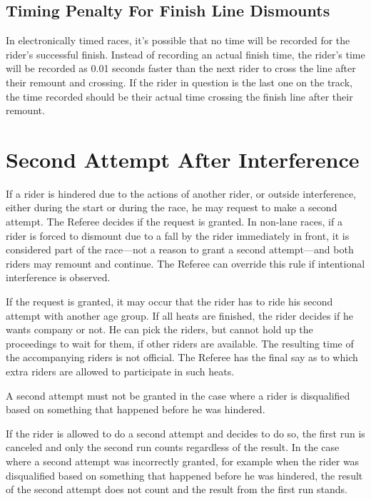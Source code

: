 \subsection{Timing Penalty For Finish Line Dismounts}
In electronically timed races, it's possible that no time will be recorded for the rider's successful finish.
Instead of recording an actual finish time, the rider's time will be recorded as 0.01 seconds faster than the next rider to cross the line after their remount and crossing.
If the rider in question is the last one on the track, the time recorded should be their actual time crossing the finish line after their remount.

\section{Second Attempt After Interference}
If a rider is hindered due to the actions of another rider, or outside interference, either during the start or during the race, he may request to make a second attempt.
The Referee decides if the request is granted. In non-lane races, if a rider is forced to dismount due to a fall by the rider immediately in front, it is considered part of the race---not a reason to grant a second attempt---and both riders may remount and continue.
The Referee can override this rule if intentional interference is observed.

If the request is granted, it may occur that the rider has to ride his second attempt with another age group.
If all heats are finished, the rider decides if he wants company or not.
He can pick the riders, but cannot hold up the proceedings to wait for them, if other riders are available.
The resulting time of the accompanying riders is not official.
The Referee has the final say as to which extra riders are allowed to participate in such heats.

A second attempt must not be granted in the case where a rider is disqualified based on something that happened before he was hindered.

If the rider is allowed to do a second attempt and decides to do so, the first run is canceled and only the second run counts regardless of the result.
In the case where a second attempt was incorrectly granted, for example when the rider was disqualified based on something that happened before he was hindered, the result of the second attempt does not count and the result from the first run stands.

